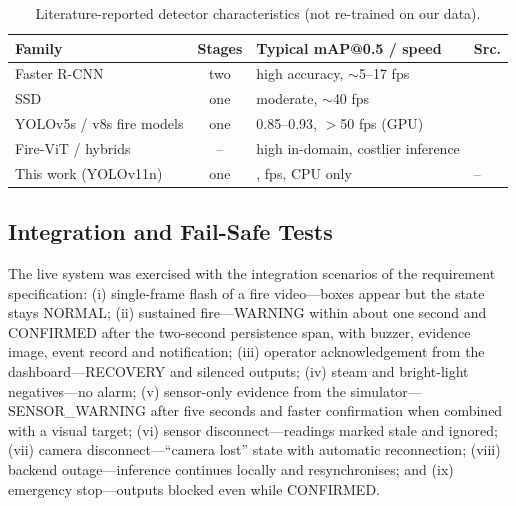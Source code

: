\documentclass[conference]{IEEEtran}
\begin{document}
\begin{table}[t]
\caption{Literature-reported detector characteristics (not re-trained on our data).}
\label{tab:compare}
\centering
\footnotesize
\setlength{\tabcolsep}{3pt}
\begin{tabular}{p{2.5cm}cp{2.9cm}p{1.1cm}}
\toprule
\textbf{Family} & \textbf{Stages} & \textbf{Typical mAP@0.5 / speed} & \textbf{Src.} \\
\midrule
Faster R-CNN & two & high accuracy, $\sim$5--17 fps & \cite{ren2015faster} \\
SSD & one & moderate, $\sim$40 fps & \cite{liu2016ssd} \\
YOLOv5s / v8s fire models & one & 0.85--0.93, $>$50 fps (GPU) & \cite{dou2024,saleh2024,kong2024} \\
Fire-ViT / hybrids & -- & high in-domain, costlier inference & \cite{liu2025firevit,ahmad2025cn2vf} \\
This work (YOLOv11n) & one & \MAPtot{}, \LATfps{} fps, CPU only & -- \\
\bottomrule
\end{tabular}
\end{table}

\subsection{Integration and Fail-Safe Tests}
The live system was exercised with the integration scenarios of the requirement specification: (i) single-frame flash of a fire video---boxes appear but the state stays NORMAL; (ii) sustained fire---WARNING within about one second and CONFIRMED after the two-second persistence span, with buzzer, evidence image, event record and notification; (iii) operator acknowledgement from the dashboard---RECOVERY and silenced outputs; (iv) steam and bright-light negatives---no alarm; (v) sensor-only evidence from the simulator---SENSOR\_WARNING after five seconds and faster confirmation when combined with a visual target; (vi) sensor disconnect---readings marked stale and ignored; (vii) camera disconnect---``camera lost'' state with automatic reconnection; (viii) backend outage---inference continues locally and resynchronises; and (ix) emergency stop---outputs blocked even while CONFIRMED.
\end{document}
